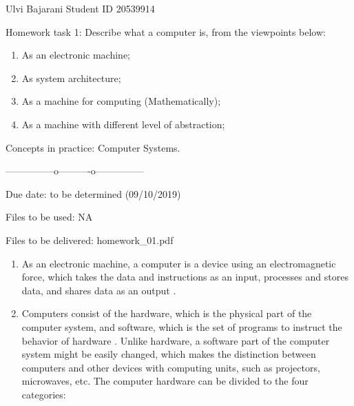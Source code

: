 \documentclass{scrartcl}
\begin{document}
\begin{Large}


\begin{center}
Ulvi Bajarani
Student ID 20539914
\end{center}

\newpage
Homework task 1:
Describe what a computer is, from the viewpoints below:


\begin{enumerate}

\item As an electronic machine;

\item As system architecture;

\item As a machine for computing (Mathematically);

\item As a machine with different level of abstraction;

\end{enumerate}

Concepts in practice: Computer Systems.



---------------o----------o---------------

Due date: to be determined (09/10/2019)

Files to be used: NA

Files to be delivered: homework\_01.pdf

\newpage

\begin{enumerate}

\item As an electronic machine, a computer is a device using an electromagnetic force, which takes the data and instructions as an input, processes and stores data, and shares data as an output \cite{internetwebsite}.

\item Computers consist of the hardware, which is the physical part of the computer system, and software, which is the set of programs to instruct the behavior of hardware \cite{warford}. Unlike hardware, a software part of the computer system might be easily changed, which makes the distinction between computers and other devices with computing units, such as projectors, microwaves, etc. The computer hardware can be divided to the four categories: \cite{internetwebsite2}

\begin{enumerate}


\end{enumerate}
\end{enumerate}
\end{Large}
\end{document}

